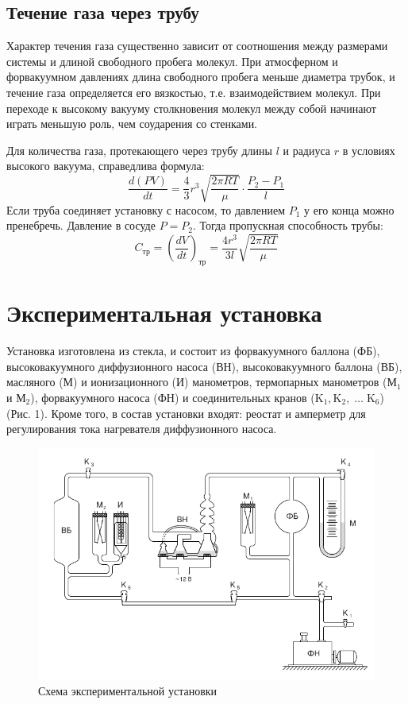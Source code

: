 \documentclass[a4paper,12pt]{article}
\begin{document}
\subsection{Течение газа через трубу}

	Характер течения газа существенно зависит от соотношения между размерами
	системы и длиной свободного пробега молекул. При атмосферном и форвакуумном
	давлениях  длина свободного пробега меньше диаметра трубок, и течение газа
	определяется его вязкостью, т.е. взаимодействием молекул. При переходе к
	высокому вакууму столкновения молекул между собой начинают играть меньшую
	роль, чем соударения со стенками.

	Для количества газа, протекающего через трубу длины $l$ и радиуса $r$ в
	условиях высокого вакуума, справедлива формула: \begin{equation}
	\frac{d(PV)}{dt} = \frac{4}{3}r^3\sqrt{\frac{2\pi RT}{\mu}}\cdot\frac{P_2 -
	P_1}{l} \label{kap} \end{equation} Если труба соединяет установку с
    насосом, то
	давлением $P_1$ у его конца можно пренебречь. Давление в сосуде $P = P_2$.
	Тогда пропускная способность трубы: \begin{equation} C_\text{тр} =
	\left(\frac{dV}{dt}\right)_\text{тр} = \frac{4r^3}{3l}\sqrt{\frac{2\pi
	RT}{\mu}} \label{ty} \end{equation}

\section{Экспериментальная установка}

    Установка изготовлена из стекла,
	и состоит из форвакуумного баллона (ФБ), высоковакуумного диффузионного
	насоса (ВН), высоковакуумного баллона (ВБ), масляного (М) и ионизационного
	(И) манометров, термопарных манометров ($\text{М}_1$ и $\text{М}_2$),
	форвакуумного насоса (ФН) и соединительных кранов ($\text{K}_1,
	\text{K}_2,\; \ldots \;\text{K}_6$) (Рис. 1). Кроме того, в
	состав установки входят: реостат и амперметр для регулирования тока
	нагревателя диффузионного насоса.

    \begin{figure}[H]
        \centering
        \includegraphics[scale=2]{img/stand.png}
        \caption{Схема экспериментальной установки}
        \label{facility}
    \end{figure}
\end{document}
